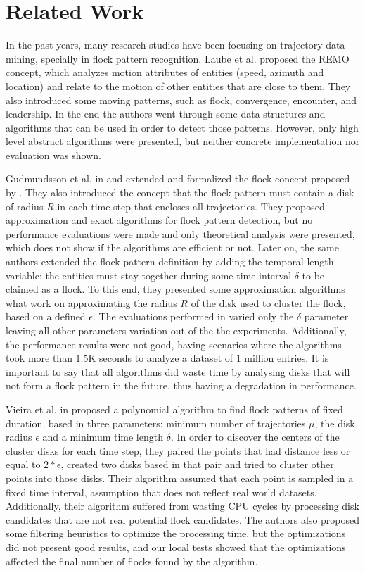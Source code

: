\chapter{Related Work}
\label{chp:relatedwork}
In the past years, many research studies have been focusing on trajectory data mining, specially in flock pattern
recognition. Laube et al. \citep{remo} proposed the REMO concept, which analyzes motion attributes of entities
(speed, azimuth and location) and relate to the motion of other entities that are close to them. They also introduced
some moving patterns, such as flock, convergence, encounter, and leadership. In the end the authors went through some
data structures and algorithms that can be used in order to detect those patterns. However, only high level abstract
algorithms were presented, but neither concrete implementation nor evaluation was shown.

Gudmundsson et al. in \citep{gudefficient} and \citep{gudlongest} extended and formalized the flock concept
proposed by \citep{remo}. They also introduced the concept that the flock pattern must contain a disk of radius $R$
in each time step that encloses all trajectories. They proposed approximation and exact algorithms for flock pattern
detection, but no performance evaluations were made and only theoretical analysis were presented, which does not show if
the algorithms are efficient or not. Later on, the same authors \citep{gudlongest} extended the flock pattern
definition by adding the temporal length variable: the entities must stay together during some time interval $\delta$ to
be claimed as a flock. To this end, they presented some approximation algorithms what work on approximating the radius
$R$ of the disk used to cluster the flock, based on a defined $\epsilon$. The evaluations performed in
\citep{gudlongest} varied only the $\delta$ parameter leaving all other parameters variation out of the the
experiments. Additionally, the performance results were not good, having scenarios where the algorithms took more than
1.5K seconds to analyze a dataset of 1 million entries. It is important to say that all algorithms did waste time by
analysing disks that will not form a flock pattern in the future, thus having a degradation in performance.

Vieira et al. in \citep{vieira} proposed a polynomial algorithm to find flock patterns of fixed duration, based in
three parameters: minimum number of trajectories $\mu$, the disk radius $\epsilon$ and a minimum time length $\delta$.
In order to discover the centers of the cluster disks for each time step, they paired the points that had distance less
or equal to $2*\epsilon$, created two disks based in that pair and tried to cluster other points into those disks. Their
algorithm assumed that each point is sampled in a fixed time interval, assumption that does not reflect real world
datasets. Additionally, their algorithm suffered from wasting CPU cycles by processing disk candidates that are not real
potential flock candidates. The authors also proposed some filtering heuristics to optimize the processing time, but the
optimizations did not present good results, and our local tests showed that the optimizations affected the final number
of flocks found by the algorithm.

